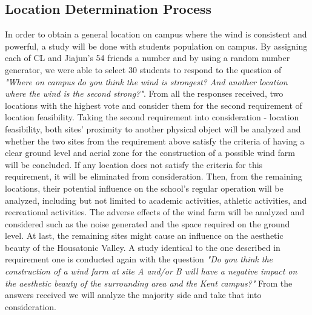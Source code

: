 \documentclass[review]{elsarticle}
\begin{document}
\subsection{Location Determination Process}
\label{sec:methods:locdeterprocess} %
In order to obtain a general location on campus where the wind is consistent and powerful, a study will be done with students population on 
campus. By assigning each of CL and Jiajun's 54 friends a number and by using a random number generator, we were able to select 30 students 
to respond to the question of \textit{"Where on campus do you think the wind is strongest? And another location where the wind is the second strong?"}. 
From all the responses received, two locations with the highest vote and consider them for the second requirement of location feasibility. 
Taking the second requirement into consideration - location feasibility, both sites' proximity to another physical object will be analyzed 
and whether the two sites from the requirement above satisfy the criteria of having a clear ground level and aerial zone for the construction 
of a possible wind farm will be concluded. If any location does not satisfy the criteria for this requirement, it will be eliminated from 
consideration. Then, from the remaining locations, their potential influence on the school's regular operation will be analyzed, including 
but not limited to academic activities, athletic activities, and recreational activities. The adverse effects of the wind farm will be analyzed 
and considered such as the noise generated and the space required on the ground level. At last, the remaining sites might cause an influence 
on the aesthetic beauty of the Housatonic Valley. A study identical to the one described in requirement one is conducted again with the question 
\textit{"Do you think the construction of a wind farm at site A and/or B will have a negative impact on the aesthetic beauty of the surrounding area and the Kent campus?"} 
From the answers received we will analyze the majority side and take that into consideration. 
\end{document}
